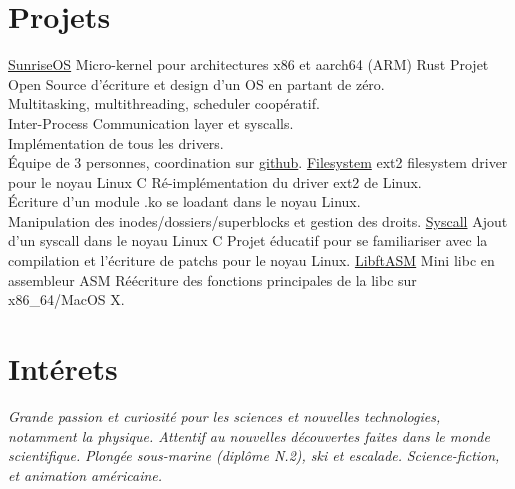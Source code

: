 \documentclass[]{twentysecondcv}
\begin{document}
\section{Projets}

\begin{twenty}
  \twentyitem
    {\href{https://github.com/roblabla42/KFS/releases}{\textcolor{cerulean}{SunriseOS}}}
    {Micro-kernel pour architectures x86 et aarch64 (ARM)}
    {Rust}
    {
		Projet Open Source d'écriture et design d'un OS en partant de zéro. \\
		Multitasking, multithreading, scheduler coopératif. \\
		Inter-Process Communication layer et syscalls. \\
		Implémentation de tous les drivers. \\
		Équipe de 3 personnes, coordination sur \href{https://github.com/roblabla42/KFS/releases}{\textcolor{cerulean}{github}}.
	}
  \twentyitem
    {\href{https://github.com/orycterope/filesystem}{\textcolor{cerulean}{Filesystem}}}
    {ext2 filesystem driver pour le noyau Linux}
    {C}
    {
		Ré-implémentation du driver ext2 de Linux. \\
		Écriture d'un module .ko se loadant dans le noyau Linux. \\
		Manipulation des inodes/dossiers/superblocks et gestion des droits.
	}
\twentyitem
    {\href{https://github.com/orycterope/process_and_memory}{\textcolor{cerulean}{Syscall}}}
    {Ajout d'un syscall dans le noyau Linux}
    {C}
    {
		Projet éducatif pour se familiariser avec la compilation et l'écriture de patchs pour le noyau Linux.
	}
\twentyitem
    {\href{https://github.com/orycterope/libftasm}{\textcolor{cerulean}{LibftASM}}}
    {Mini libc en assembleur}
    {ASM}
    {
		Réécriture des fonctions principales de la libc sur x86\_64/MacOS X.
	}
\end{twenty}

\section{Intérets}

\begin{twentyshort}
  \twentyitemshortright
    {\textsc{\icon{\faFlask}}}
    {\emph{Grande passion et curiosité pour les sciences et nouvelles technologies, notamment la physique. Attentif au nouvelles découvertes faites dans le monde scientifique.}}
  \twentyitemshortright
    {\textsc{\icon{\faFutbolO}}}
    {\emph{Plongée sous-marine (diplôme N.2), ski et escalade.}}
  \twentyitemshortright
    {\textsc{\icon{\faFilm}}}
    {\emph{Science-fiction, et animation américaine.}}
\end{twentyshort}

\end{document}

